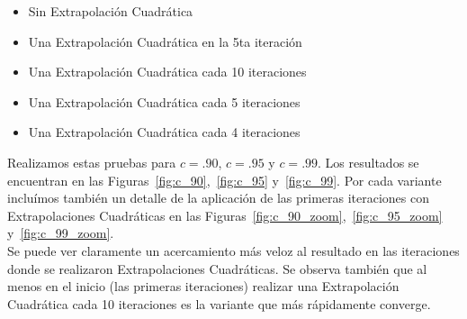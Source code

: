 \begin{itemize}
    \item Sin Extrapolación Cuadrática
    \item Una Extrapolación Cuadrática en la 5ta iteración
    \item Una Extrapolación Cuadrática cada 10 iteraciones
    \item Una Extrapolación Cuadrática cada 5 iteraciones
    \item Una Extrapolación Cuadrática cada 4 iteraciones
\end{itemize}

Realizamos estas pruebas para $c=.90$, $c=.95$ y $c=.99$. Los resultados se
encuentran en las Figuras~\ref{fig:c_90},~\ref{fig:c_95} y~\ref{fig:c_99}. Por
cada variante incluímos también un detalle de la aplicación de las primeras
iteraciones con Extrapolaciones Cuadráticas en las
Figuras~\ref{fig:c_90_zoom},~\ref{fig:c_95_zoom} y~\ref{fig:c_99_zoom}.\\

Se puede ver claramente un acercamiento más veloz al resultado en las
iteraciones donde se realizaron Extrapolaciones Cuadráticas. Se observa también
que al menos en el inicio (las primeras iteraciones) realizar una Extrapolación
Cuadrática cada 10 iteraciones es la variante que más rápidamente converge.

